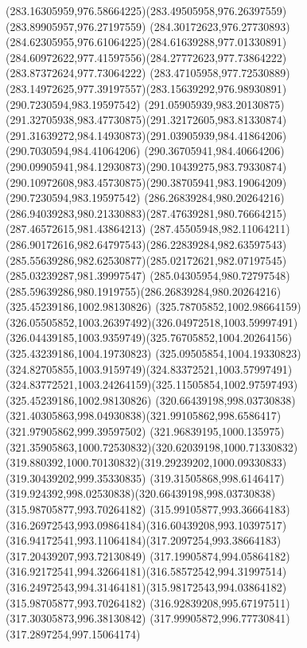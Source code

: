 {    \curveto(283.16305959,976.58664225)(283.49505958,976.26397559)(283.89905957,976.27197559)
    \curveto(284.30172623,976.27730893)(284.62305955,976.61064225)(284.61639288,977.01330891)
    \curveto(284.60972622,977.41597556)(284.27772623,977.73864222)(283.87372624,977.73064222)
    \curveto(283.47105958,977.72530889)(283.14972625,977.39197557)(283.15639292,976.98930891)
    \moveto(290.7230594,983.19597542)
    \curveto(291.05905939,983.20130875)(291.32705938,983.47730875)(291.32172605,983.81330874)
    \curveto(291.31639272,984.14930873)(291.03905939,984.41864206)(290.7030594,984.41064206)
    \curveto(290.36705941,984.40664206)(290.09905941,984.12930873)(290.10439275,983.79330874)
    \curveto(290.10972608,983.45730875)(290.38705941,983.19064209)(290.7230594,983.19597542)
    \moveto(286.26839284,980.20264216)
    \curveto(286.94039283,980.21330883)(287.47639281,980.76664215)(287.46572615,981.43864213)
    \curveto(287.45505948,982.11064211)(286.90172616,982.64797543)(286.22839284,982.63597543)
    \curveto(285.55639286,982.62530877)(285.02172621,982.07197545)(285.03239287,981.39997547)
    \curveto(285.04305954,980.72797548)(285.59639286,980.1919755)(286.26839284,980.20264216)
    \moveto(325.45239186,1002.98130826)
    \curveto(325.78705852,1002.98664159)(326.05505852,1003.26397492)(326.04972518,1003.59997491)
    \curveto(326.04439185,1003.9359749)(325.76705852,1004.20264156)(325.43239186,1004.19730823)
    \curveto(325.09505854,1004.19330823)(324.82705855,1003.9159749)(324.83372521,1003.57997491)
    \curveto(324.83772521,1003.24264159)(325.11505854,1002.97597493)(325.45239186,1002.98130826)
    \moveto(320.66439198,998.03730838)
    \curveto(321.40305863,998.04930838)(321.99105862,998.6586417)(321.97905862,999.39597502)
    \curveto(321.96839195,1000.135975)(321.35905863,1000.72530832)(320.62039198,1000.71330832)
    \curveto(319.880392,1000.70130832)(319.29239202,1000.09330833)(319.30439202,999.35330835)
    \curveto(319.31505868,998.6146417)(319.924392,998.02530838)(320.66439198,998.03730838)
    \moveto(315.98705877,993.70264182)
    \curveto(315.99105877,993.36664183)(316.26972543,993.09864184)(316.60439208,993.10397517)
    \curveto(316.94172541,993.11064184)(317.2097254,993.38664183)(317.20439207,993.72130849)
    \curveto(317.19905874,994.05864182)(316.92172541,994.32664181)(316.58572542,994.31997514)
    \curveto(316.24972543,994.31464181)(315.98172543,994.03864182)(315.98705877,993.70264182)
    \moveto(316.92839208,995.67197511)
    \lineto(317.30305873,996.38130842)
    \lineto(317.99905872,996.77730841)
    \lineto(317.2897254,997.15064174)
}
